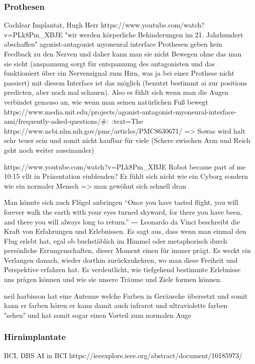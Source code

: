 \documentclass[a4paper,
DIV=13,
12pt,
BCOR=10mm,
department=FakEI,
twoside,
parskip=half,
automark,
]{OTHRartcl}
\begin{document}
\subsubsection*{Prothesen}
Cochlear Implantat, Hugh Herr https://www.youtube.com/watch?v=PLk8Pm_XBJE "wir werden körperliche Behinderungen im 21. Jahrhundert abschaffen"
agonist-antagonist myoneural interface Prothesen geben kein Feedback zu den Nerven und daher kann man sie nicht Bewegen ohne das man sie sieht
(anspannung sorgt für entspannung des antagonisten und das funktioniert über ein Nervensignal zum Hirn, was ja bei einer Prothese nicht passiert)
mit diesem Interface ist das möglich (benutzt bestimmt ai zur positions predicten, aber noch mal schauen). Also es fühlt sich wenn man die Augen 
verbindet genauso an, wie wenn man seinen natürlichen Fuß bewegt
https://www.media.mit.edu/projects/agonist-antagonist-myoneural-interface-ami/frequently-asked-questions/#:~:text=The%
https://www.ncbi.nlm.nih.gov/pmc/articles/PMC8630671/
=> Sowas wird halt sehr teuer sein und somit nicht kaufbar für viele (Schere zwischen Arm und Reich geht noch weiter auseinander)

https://www.youtube.com/watch?v=PLk8Pm_XBJE Robot became part of me 10:15 vllt in Präsentation einblenden? Er fühlt sich nicht wie ein Cyborg
sondern wie ein normaler Mensch => man gewöhnt sich schnell dran

Man könnte sich auch Flügel anbringen
“Once you have tasted flight, you will forever walk the earth with your eyes turned skyward, for there you have been, and there you will always long to return.”
― Leonardo da Vinci
beschreibt die Kraft von Erfahrungen und Erlebnissen. Es sagt aus, dass wenn man einmal den Flug erlebt hat, egal ob buchstäblich im Himmel oder metaphorisch durch persönliche Errungenschaften,
dieser Moment einen für immer prägt. Es weckt ein Verlangen danach, wieder dorthin zurückzukehren, wo man diese Freiheit und Perspektive erfahren hat. Es verdeutlicht, wie tiefgehend bestimmte Erlebnisse uns prägen können und wie sie unsere Träume und Ziele formen können.

neil harbisson hat eine Antenne welche Farben in Geräusche übersetzt und somit kann er farben hören er kann damit auch infrarot und ultraviolette farben "sehen" und hat somit sogar einen Vorteil zum normalen Auge
\subsubsection*{Hirnimplantate}
BCI, DBS
AI in BCI
https://ieeexplore.ieee.org/abstract/document/10185973/
\end{document}
